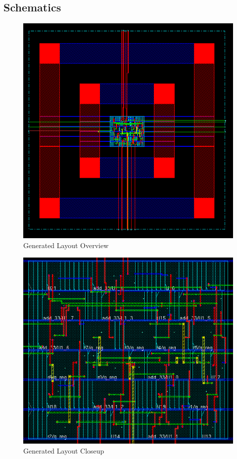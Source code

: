 \documentclass[12pt]{article}
\begin{document}
\subsection{Schematics}
\begin{figure}[H]
\centering
\includegraphics[width=1\linewidth]{layout-1}
\caption{Generated Layout Overview}
\label{fig:layout-1}
\end{figure}

\begin{figure}[H]
\centering
\includegraphics[width=1\linewidth]{layou-2}
\caption{Generated Layout Closeup}
\label{fig:layou-2}
\end{figure}
\end{document}
